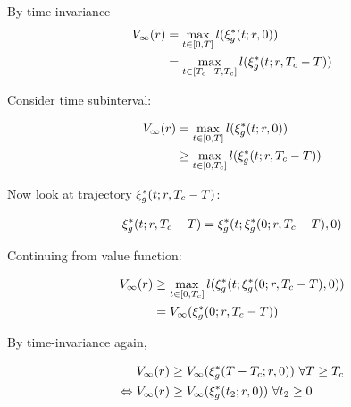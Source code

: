 By time-invariance
 \begin{equation}
 \begin{aligned}
 V_\infty(r) &= \max_{t \in [0, T]} l(\xi_g^*(t; r, 0)) \\
 &= \max_{t \in [T_c-T, T_c]} l(\xi_g^*(t; r, T_c-T)) \\
 \end{aligned}
 \end{equation}  
 
Consider time subinterval:
 
 \begin{equation}
\begin{aligned}
V_\infty(r) &= \max_{t \in [0, T]} l(\xi_g^*(t; r, 0)) \\
&\ge \max_{t \in [0, T_c]} l(\xi_g^*(t; r, T_c-T)) \\
\end{aligned}
\end{equation}  

Now look at trajectory $\xi_g^*(t; r, T_c-T)$:

\begin{equation}
\begin{aligned}
\xi_g^*(t; r, T_c-T) = \xi_g^*(t; \xi_g^*(0; r, T_c-T), 0)
\end{aligned}
\end{equation}

Continuing from value function:

\begin{equation}
\begin{aligned}
V_\infty(r) &\ge \max_{t \in [0, T_c]} l(\xi_g^*(t; \xi_g^*(0; r, T_c-T), 0)) \\
&= V_\infty(\xi_g^*(0; r, T_c-T))
\end{aligned}
\end{equation} 
 
 By time-invariance again,
 
 \begin{equation}
 \begin{aligned}
 V_\infty(r) &\ge V_\infty(\xi_g^*(T-T_c; r, 0)) ~ \forall T\ge T_c \\
 \Leftrightarrow  V_\infty(r) &\ge V_\infty(\xi_g^*(t_2; r, 0)) ~ \forall t_2 \ge 0
 \end{aligned}
 \end{equation} 
 
